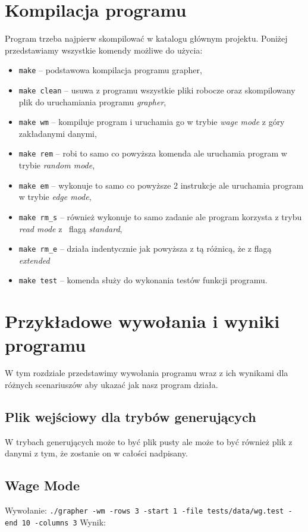 \documentclass[10pt, a4paper]{report}
\begin{document}
    \section{Kompilacja programu}
    Program trzeba najpierw skompilować w katalogu głównym projektu. Poniżej przedstawiamy wszystkie komendy możliwe do użycia:
    \begin{itemize}
        \item \texttt{make} -- podstawowa kompilacja programu grapher,
        \item \texttt{make clean} -- usuwa z programu wszystkie pliki robocze oraz skompilowany plik do uruchamiania programu \textit{grapher},
        \item \texttt{make wm} -- kompiluje program i uruchamia go w trybie \textit{wage mode} z góry zakładanymi danymi,
        \item \texttt{make rem} -- robi to samo co powyższa komenda ale uruchamia program w trybie \textit{random mode},
        \item \texttt{make em} -- wykonuje to samo co powyższe 2 instrukcje ale uruchamia program w trybie \textit{edge mode},
        \item \texttt{make rm\_s} -- również wykonuje to samo zadanie ale program korzysta z trybu \textit{read mode} z~ flagą \textit{standard},
        \item \texttt{make rm\_e} -- działa indentycznie jak powyższa z tą różnicą, że z flagą \textit{extended}
        \item \texttt{make test} -- komenda służy do wykonania testów funkcji programu.
    \end{itemize}

    \section{Przykładowe wywołania i wyniki programu}
    W tym rozdziale przedstawimy wywołania programu wraz z ich wynikami dla różnych scenariuszów aby ukazać jak nasz program działa.

    \subsection{Plik wejściowy dla trybów generujących}
    W trybach generujących może to być plik pusty ale może to być również plik z danymi z tym, że zostanie on w całości nadpisany.

    \subsection{Wage Mode}
    Wywołanie:
    \newline\newline \texttt{./grapher -wm -rows 3 -start 1 -file tests/data/wg.test -end 10 -columns 3}
    \newline\newline Wynik:
    
\end{document}
